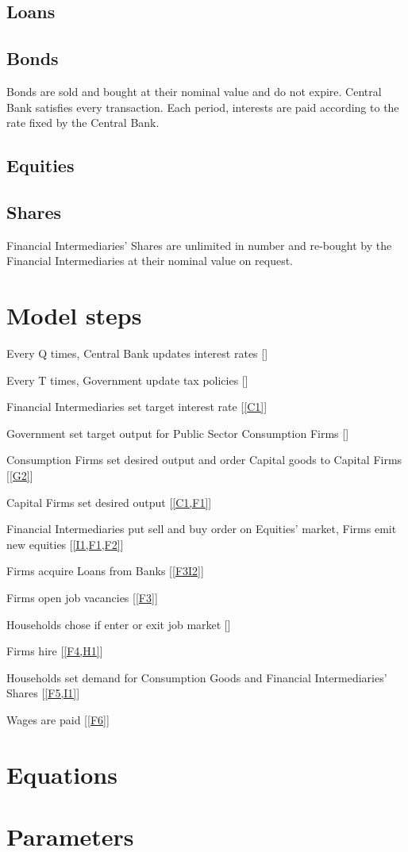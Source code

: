 \documentclass[a4paper, headings=standardclasses]{scrartcl}
\begin{document}
\subsection{Loans}

\subsection{Bonds}
Bonds are sold and bought at their nominal value and do not expire. Central Bank satisfies every transaction. Each period, interests are paid according to the rate fixed by the Central Bank.

\subsection{Equities}

\subsection{Shares}
Financial Intermediaries' Shares are unlimited in number and re-bought by the Financial Intermediaries at their nominal value on request.

\section{Model steps}
\begin{steps}
	\item \label{C1} Every Q times, Central Bank updates interest rates []
	\item \label{G1} Every T times, Government update tax policies []
	\item \label{I1} Financial Intermediaries set target interest rate [\cref{C1}]
	\item \label{G2} Government set target output for Public Sector Consumption Firms []
	\item \label{F1} Consumption Firms set desired output and order Capital goods to Capital Firms [\cref{G2}]
	\item \label{F2} Capital Firms set desired output [\cref{C1,F1}]
	\item \label{F3I2} Financial Intermediaries put sell and buy order on Equities' market, Firms emit new equities [\cref{I1,F1,F2}]
	\item \label{F4} Firms acquire Loans from Banks [\cref{F3I2}]
	\item \label{F5} Firms open job vacancies [\cref{F3}]
	\item \label{H1} Households chose if enter or exit job market []
	\item \label{F6} Firms hire [\cref{F4,H1}]
	\item \label{H2} Households set demand for Consumption Goods and Financial Intermediaries' Shares [\cref{F5,I1}]
	\item \label{F7} Wages are paid [\cref{F6}]
	
\end{steps}

\section{Equations}

\section{Parameters}
	
	\printbibliography
	
\end{document}
